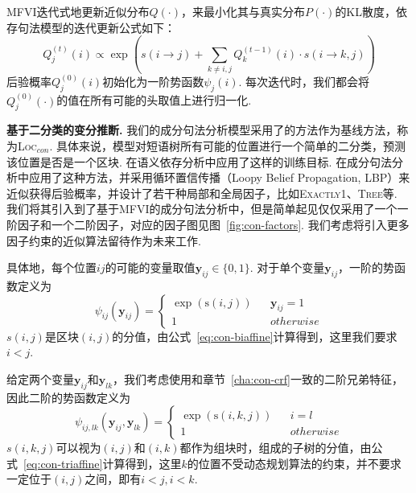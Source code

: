 MFVI迭代式地更新近似分布$Q(\cdot)$，来最小化其与真实分布$P(\cdot)$的KL散度，依存句法模型的迭代更新公式如下\cite{wang-tu-2020-second}：
\begin{equation}
  \label{eq:mfvi-dep}
  Q_{j}^{(t)}(i)\propto \exp\left(s(i\rightarrow j) +\sum_{k\neq i,j} Q_{k}^{(t-1)}(i)\cdot s(i\rightarrow {k,j}) \right)
\end{equation}
后验概率$Q_j^{(0)}(i)$初始化为一阶势函数$\psi_j(i)$.
每次迭代时，我们都会将$Q_j^{(0)}(\cdot)$的值在所有可能的头取值上进行归一化.

\noindent\textbf{基于二分类的变分推断.}
我们的成分句法分析模型采用了\cite{gaddy-etal-2018-whats}的方法作为基线方法，称为\textsc{Loc}$_{con}$.
具体来说，模型对短语树所有可能的位置进行一个简单的二分类，预测该位置是否是一个区块.
\cite{dozat-manning-2018-simpler,wang-etal-2019-second}在语义依存分析中应用了这样的训练目标.
\cite{gormley-eisner-2015-structured,naradowsky-etal-2012-grammarless}在成分句法分析中应用了这种方法，并采用循环置信传播（Loopy Belief Propagation, LBP）来近似获得后验概率，并设计了若干种局部和全局因子，比如\textsc{Exactly1}、\textsc{Tree}等.
我们将其引入到了基于MFVI的成分句法分析中，但是简单起见仅仅采用了一个一阶因子和一个二阶因子，对应的因子图见图~\ref{fig:con-factors}.
我们考虑将引入更多因子约束的近似算法留待作为未来工作.


具体地，每个位置$ij$的可能的变量取值$\boldsymbol{y}_{ij}\in \{0,1\}$. 对于单个变量$\boldsymbol{y}_{ij}$，一阶的势函数定义为
\begin{equation}
  \label{eq:1o-potential}
  \psi_{ij}(\boldsymbol{y}_{ij})=\left\{
  \begin{array}{rcl}
    \exp\left(\mathrm{s}(i,j)\right) &  & {\boldsymbol{y}_{ij}=1} \\
    1                                &  & {otherwise}
  \end{array}
  \right.
\end{equation}
$s(i,j)$是区块$(i,j)$的分值，由公式~\ref{eq:con-biaffine}计算得到，这里我们要求$i<j$.

给定两个变量$\boldsymbol{y}_{ij}$和$\boldsymbol{y}_{lk}$，我们考虑使用和章节~\ref{cha:con-crf}一致的二阶兄弟特征，因此二阶的势函数定义为
\begin{equation}
  \label{eq:2o-con-potential}
  \psi_{ij,lk}(\boldsymbol{y}_{ij},\boldsymbol{y}_{lk})=\left\{
  \begin{array}{rcl}
    \exp\left(\mathrm{s}(i,k,j)\right) &  & {i=l}       \\
    1                                  &  & {otherwise}
  \end{array}
  \right.
\end{equation}
$s(i,k,j)$可以视为$(i,j)$和$(i,k)$都作为组块时，组成的子树的分值，由公式~\ref{eq:con-triaffine}计算得到，这里$k$的位置不受动态规划算法的约束，并不要求一定位于$(i,j)$之间，即有$i<j,i<k$.

